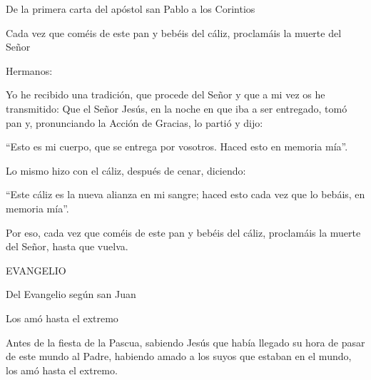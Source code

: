 			\begin{readbook}De la primera carta del apóstol san Pablo a los Corintios \end{readbook}
			
			\begin{readtheme}Cada vez que coméis de este pan y bebéis del cáliz, proclamáis la muerte del Señor\end{readtheme}
			
			\begin{readbody}Hermanos: \end{readbody}
			
			\begin{readbody}Yo he recibido una tradición, que procede del Señor y que a mi vez os he transmitido: Que el Señor Jesús, en la noche en que iba a ser entregado, tomó pan y, pronunciando la Acción de Gracias, lo partió y dijo: \end{readbody}
			
			\begin{readtalk}“Esto es mi cuerpo, que se entrega por vosotros. Haced esto en memoria mía”. \end{readtalk}
			
			\begin{readbody}Lo mismo hizo con el cáliz, después de cenar, diciendo: \end{readbody}
			
			\begin{readtalk}“Este cáliz es la nueva alianza en mi sangre; haced esto cada vez que lo bebáis, en memoria mía”. \end{readtalk}
			
			\begin{readbody}Por eso, cada vez que coméis de este pan y bebéis del cáliz, proclamáis la muerte del Señor, hasta que vuelva.\end{readbody}
			
			\begin{readtitle}EVANGELIO\end{readtitle}
			
			\begin{readbook}Del Evangelio según san Juan \end{readbook}
			
			\begin{readtheme}Los amó hasta el extremo\end{readtheme}
			
			\begin{readbody}Antes de la fiesta de la Pascua, sabiendo Jesús que había llegado su hora de pasar de este mundo al Padre, habiendo amado a los suyos que estaban en el mundo, los amó hasta el extremo. \end{readbody}
			
